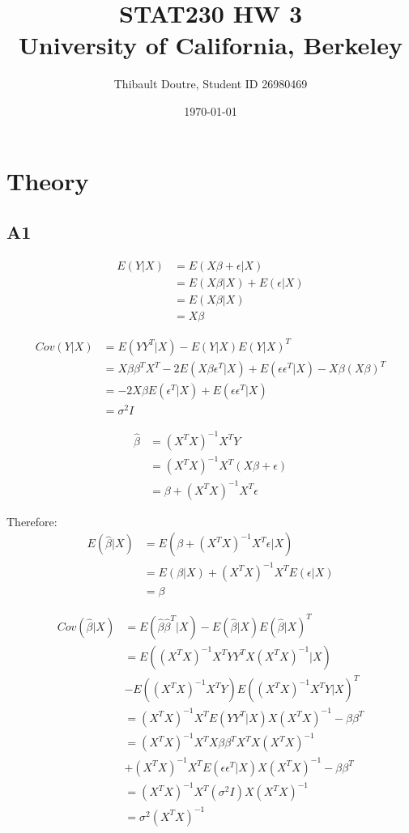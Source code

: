 \documentclass[11pt]{article}\usepackage[]{graphicx}\usepackage[]{color}
\author{Thibault Doutre, Student ID 26980469}
\title{STAT230 HW 3 \\
University of California, Berkeley}
\date{\today}
\begin{document}
\maketitle

\section{Theory}
\subsection{A1}

\begin{align}
E(Y|X) &= E(X\beta+\epsilon|X) \\
&= E(X\beta|X)+E(\epsilon|X) \\
&= E(X\beta|X) \\
&= X\beta
\end{align}


\begin{align}
Cov(Y|X) &= E(YY^T|X) - E(Y|X)E(Y|X)^T \\
&= X\beta \beta^T X^T - 2 E(X\beta \epsilon^T|X)+E(\epsilon \epsilon^T|X) - X\beta(X\beta)^T \\
&= -2 X\beta E(\epsilon^T|X) + E(\epsilon \epsilon^T|X) \\
&= \sigma^2 I
\end{align}

\begin{align}
\hat{\beta} &= (X^TX)^{-1}X^TY \\
&= (X^TX)^{-1}X^T(X\beta+\epsilon) \\
&= \beta + (X^TX)^{-1}X^T \epsilon 
\end{align}

Therefore: 
\begin{align}
E(\hat{\beta}|X) &= E(\beta + (X^TX)^{-1}X^T \epsilon | X) \\
&= E(\beta |X) + (X^TX)^{-1}X^T E(\epsilon | X) \\
&= \beta
\end{align}

\begin{align}
Cov(\hat{\beta}|X) &= E(\hat{\beta}\hat{\beta}^T|X) - E(\hat{\beta}|X)E(\hat{\beta}|X)^T \\
&= E((X^TX)^{-1}X^TYY^TX(X^TX)^{-1}|X) \\ 
& - E((X^TX)^{-1}X^TY)E((X^TX)^{-1}X^TY|X)^T \\
&= (X^TX)^{-1}X^T E(Y Y^T|X) X(X^TX)^{-1}-\beta \beta^T \\
&= (X^TX)^{-1}X^TX\beta \beta^T X^T X(X^TX)^{-1} \\
& +(X^TX)^{-1}X^TE(\epsilon \epsilon^T|X)X(X^TX)^{-1} -\beta \beta^T \\
&=  (X^TX)^{-1}X^T(\sigma^2 I)X(X^TX)^{-1} \\
&= \sigma^2 (X^TX)^{-1}
\end{align}
\end{document}
